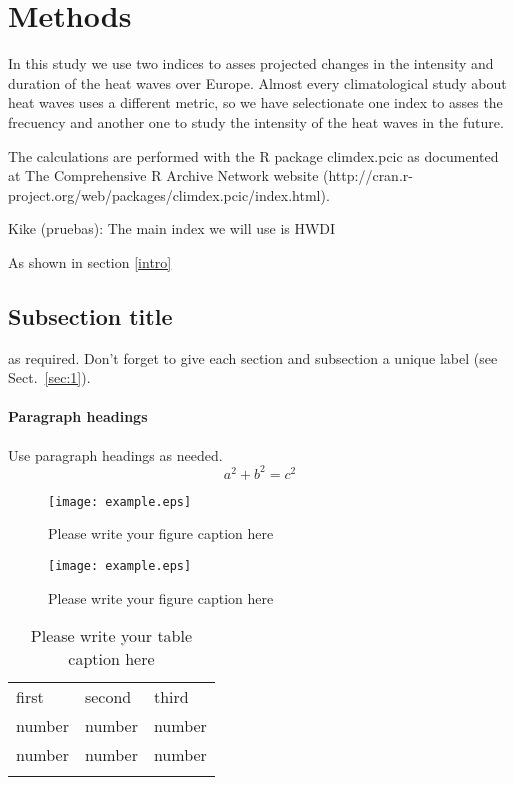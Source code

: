 \section{Methods}

In this study we use two indices to asses projected changes in the intensity and duration of the heat waves over Europe. Almost every climatological study about heat waves  uses a different metric, so we have selectionate one index to asses the frecuency and another one to study the intensity of the heat waves  in the future.   

The calculations are performed with the R package climdex.pcic as documented at The Comprehensive R Archive Network website (http://cran.r-project.org/web/packages/climdex.pcic/index.html).  

Kike (pruebas): The main index we will use is HWDI \citep{rus_al2004}


As shown in section \ref{intro}
\label{sec:1}
\subsection{Subsection title}
\label{sec:2}
as required. Don't forget to give each section
and subsection a unique label (see Sect.~\ref{sec:1}).
\paragraph{Paragraph headings} Use paragraph headings as needed.
\begin{equation}
a^2+b^2=c^2
\end{equation}

\begin{figure}
  \texttt{[image: example.eps]}
\caption{Please write your figure caption here}
\label{fig:1}       %
\end{figure}
%
\begin{figure*}
  \texttt{[image: example.eps]}
\caption{Please write your figure caption here}
\label{fig:2}       %
\end{figure*}
%
\begin{table}
\caption{Please write your table caption here}
\label{tab:1}       %
\begin{tabular}{lll}
\hline\noalign{\smallskip}
first & second & third  \\
\noalign{\smallskip}\hline\noalign{\smallskip}
number & number & number \\
number & number & number \\
\noalign{\smallskip}\hline
\end{tabular}
\end{table}


